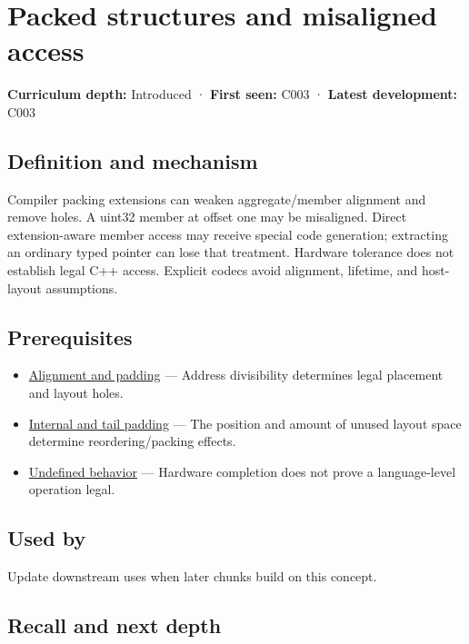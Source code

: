 \hypertarget{appendix-0682dbfc5f0e}{}
\section{Packed structures and misaligned access}\label{appendix-0682dbfc5f0e-packed-structures-and-misaligned-access}

\textbf{Curriculum depth:} Introduced · \textbf{First seen:} C003 · \textbf{Latest development:} C003

\subsection{Definition and mechanism}\label{appendix-0682dbfc5f0e-definition-and-mechanism}

Compiler packing extensions can weaken aggregate/member alignment and remove holes. A uint32 member at offset one may be misaligned. Direct extension-aware member access may receive special code generation; extracting an ordinary typed pointer can lose that treatment. Hardware tolerance does not establish legal C++ access. Explicit codecs avoid alignment, lifetime, and host-layout assumptions.

\subsection{Prerequisites}\label{appendix-0682dbfc5f0e-prerequisites}

\begin{itemize}
\tightlist
\item
  \hyperref[appendix-a1f7c53b4742]{Alignment and padding} --- Address divisibility determines legal placement and layout holes.
\item
  \hyperref[appendix-f52f8c5a3afd]{Internal and tail padding} --- The position and amount of unused layout space determine reordering/packing effects.
\item
  \hyperref[appendix-f558f5b4d8f2]{Undefined behavior} --- Hardware completion does not prove a language-level operation legal.
\end{itemize}

\subsection{Used by}\label{appendix-0682dbfc5f0e-used-by}

Update downstream uses when later chunks build on this concept.

\subsection{Recall and next depth}\label{appendix-0682dbfc5f0e-recall-and-next-depth}

